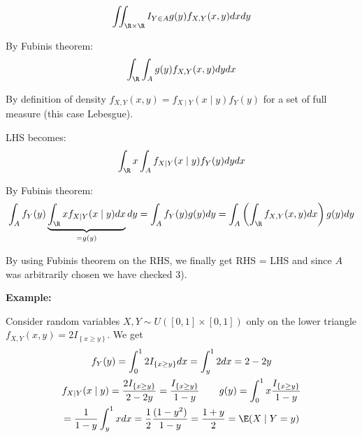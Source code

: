 \begin{equation*}
  \begin{gathered}
    \iint_{\R\times \R} I_{Y\in A}g(y)f_{X,Y}(x,y)dxdy
  \end{gathered}
\end{equation*}\par
\noindent By Fubinis theorem:
\begin{equation*}
  \begin{gathered}
    \int_\R\int_A g(y)f_{X,Y}(x,y)dydx
  \end{gathered}
\end{equation*}\par
\noindent By definition of density $f_{X,Y}(x,y)=f_{X\mid Y}(x\mid y)f_Y(y)$ for a set of full measure (this case Lebesgue).\par
\noindent LHS becomes:
\begin{equation*}
  \begin{gathered}
    \int_\R x\int_A f_{X\mid Y}(x\mid y)f_Y(y)dydx
  \end{gathered}
\end{equation*}\par
\noindent By Fubinis theorem:
\begin{equation*}
  \begin{gathered}
    \int_A f_Y(y)\underbrace{\int_\R xf_{X\mid Y}(x\mid y)dx}_{=g(y)}dy = \int_A f_Y(y)g(y)dy = \int_A\left(\int_\R f_{X,Y}(x,y)dx\right)g(y)dy
  \end{gathered}
\end{equation*}\par
\noindent By using Fubinis theorem on the RHS, we finally get RHS = LHS and since $A$ was arbitrarily chosen we have checked 3).
\par\bigskip
\noindent\textbf{Example:}\par
\noindent Consider random variables $X,Y\sim U\left([0,1]\times[0,1]\right)$ only on the lower triangle $f_{X,Y}(x,y) = 2I_{\left\{x\geq y\right\}}$. We get
\begin{equation*}
  \begin{gathered}
    f_Y(y) = \int_{0}^{1}2I_{\left\{x\geq y\right\}}dx = \int_{y}^{1}2dx = 2-2y\\
    f_{X\mid Y}(x\mid y) = \dfrac{2I_{\left\{x\geq y\right\}}}{2-2y} = \dfrac{I_{\left\{x\geq y\right\}}}{1-y}\qquad g(y) = \int_{0}^{1}x\dfrac{I_{\left\{x\geq y\right\}}}{1-y}\\
    = \dfrac{1}{1-y}\int_{y}^{1}xdx = \dfrac{1}{2}\dfrac{(1-y^2)}{1-y} = \dfrac{1+y}{2} = \E(X\mid Y=y)
  \end{gathered}
\end{equation*}
